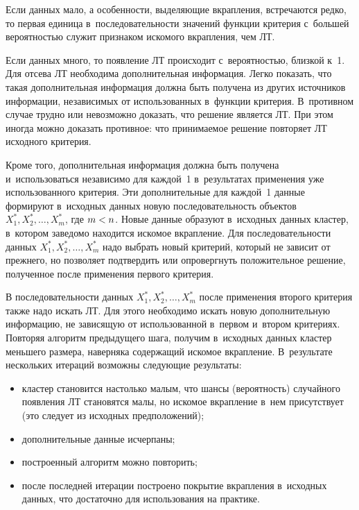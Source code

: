 \begin{multicols}{2}
{}
  
  Если данных мало, а особенности, выделяющие вкрапления, встречаются редко, 
то первая единица в~последовательности значений функции критерия с~большей 
вероятностью служит признаком искомого вкрапления, чем ЛТ. 
  
  Если данных много, то появление ЛТ происходит с~вероятностью, близкой к~1. 
Для отсева ЛТ необходима дополнительная информация. Легко показать, что такая 
дополнительная информация должна быть получена из других источников 
информации, независимых от использованных в~функции критерия. В~противном 
случае трудно или невозможно доказать, что решение является ЛТ. При этом 
иногда можно доказать противное: что принимаемое решение повторяет ЛТ 
исходного критерия. 
  
  Кроме того, дополнительная информация должна быть получена 
  и~использоваться независимо для каж\-дой~1 в~результатах применения уже 
использованного критерия. Эти дополнительные для каж\-дой~1 данные 
формируют в~исходных данных новую последовательность объектов $X_1^*, 
X_2^*, \ldots , X_m^*$, где $m\hm< n$. Новые данные образуют в~исходных 
данных кластер, в~котором заведомо находится искомое вкрапление. Для 
последовательности данных $X_1^*, X_2^*, \ldots , X_m^*$ надо выбрать новый 
критерий, который не зависит от прежнего, но позволяет подтвердить или 
опровергнуть положительное решение, полученное после применения первого 
критерия. 
  
  В последовательности данных $X_1^*, X_2^*, \ldots , X_m^*$ после 
применения второго критерия также надо искать ЛТ. Для этого необходимо искать 
новую дополнительную информацию, не зависящую от использованной в~первом и~втором критериях. Повторяя алгоритм предыдущего шага, получим в~исходных 
данных кластер меньшего размера, наверняка содержащий искомое вкрапление. 
В~результате нескольких итераций возможны следующие ре\-зуль\-таты:
  \begin{itemize}
\item кластер становится настолько малым, что шансы (вероятность) случайного 
появления ЛТ становятся малы, но искомое вкрапление в~нем присутствует (это 
следует из исходных предположений);
\item дополнительные данные исчерпаны;
\item построенный алгоритм можно повторить;
\item после последней итерации построено покрытие вкрапления в~исходных 
данных, что достаточно для использования на практике.
\end{itemize}
  

\end{multicols}
